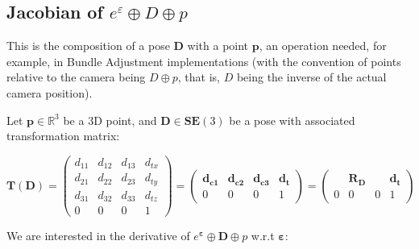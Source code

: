 \documentclass[a4paper,11pt]{report}
\newcommand{\E}{{\bm{\varepsilon}}}
\begin{document}
\subsection{Jacobian of $e^\varepsilon \oplus D \oplus p$}
\label{sect:jacob_eDp}

This is the composition of a pose $\mathbf{D}$ with a point $\mathbf{p}$,
an operation needed, for example, in Bundle Adjustment implementations \cite{triggs2000bundle}
(with the convention of points relative to the camera being $D \oplus p$, that is,
$D$ being the inverse of the actual camera position).

Let $\mathbf{p} \in \mathbb{R}^3$ be a 3D point, and
$\mathbf{D} \in \mathbf{SE}(3)$ be a pose with associated transformation matrix:

\begin{equation}
\mathbf{T}(\mathbf{D}) =
\left(
\begin{array}{ccc|c}
 d_{11} & d_{12} & d_{13} & d_{tx}   \\
 d_{21} & d_{22} & d_{23} & d_{ty}   \\
 d_{31} & d_{32} & d_{33} & d_{tz}   \\
\hline
  0 & 0 & 0 & 1
\end{array}
\right)
=
\left(
\begin{array}{ccc|c}
 \mathbf{d_{c1}}  & \mathbf{d_{c2}}  & \mathbf{d_{c3}}  & \mathbf{d_{t}}  \\
\hline
  0 & 0 & 0 & 1
\end{array}
\right)
=
\left(
\begin{array}{ccc|c}
   & \mathbf{R_D}  &  & \mathbf{d_{t}}  \\
\hline
  0 & 0 & 0 & 1
\end{array}
\right)
\end{equation}

We are interested in the derivative of $e^\E \oplus \mathbf{D} \oplus p$ w.r.t $\E$:
\end{document}
